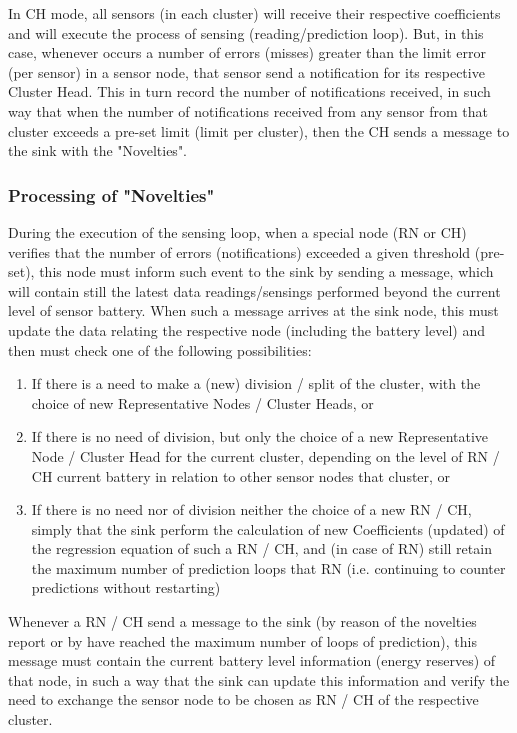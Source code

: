 \documentclass[conference]{IEEEtran}
\begin{document}
In CH mode, all sensors (in each cluster) will receive their respective
coefficients and will execute the process of sensing (reading/prediction loop).
But, in this case, whenever occurs a number of errors (misses) greater than the
limit error (per sensor) in a sensor node, that sensor send a
notification for its respective Cluster Head. This in turn record the number of
notifications received, in such way that when the number of notifications
received from any sensor from that cluster exceeds a pre-set limit (limit per
cluster), then the CH sends a message to the sink with the "Novelties".

\subsubsection{Processing of "Novelties"}

During the execution of the sensing loop, when a special node (RN or CH)
verifies that the number of errors (notifications) exceeded a given threshold
(pre-set), this node must inform such event to the sink by sending a message,
which will contain still the latest data readings/sensings performed beyond the
current level of sensor battery. 
When such a message arrives at the sink node, this must update
the data relating the respective node (including the battery level) and then
must check one of the following possibilities:

\begin{enumerate}
    \item If there is a need to make a (new) division / split of the cluster,
    with the choice of new Representative Nodes / Cluster Heads, or
    \item If there is no need of division, but only the choice of a new
    Representative Node / Cluster Head for the current cluster, depending on the
    level of RN / CH current battery in relation to other sensor nodes that
    cluster, or
    \item If there is no need nor of division neither the choice of a new RN /
    CH, simply that the sink perform the calculation of new Coefficients
    (updated) of the regression equation of such a RN / CH, and (in case of RN)
    still retain the maximum number of prediction loops that RN (i.e. continuing
    to counter predictions without restarting)
\end{enumerate}


Whenever a RN / CH send a message to the sink (by reason of the novelties report
or by have reached the maximum number of loops of prediction), this message must
contain the current battery level information (energy reserves) of that node, in
such a way that the sink can update this information and verify the need to
exchange the sensor node to be chosen as RN / CH of the respective cluster.
\end{document}
